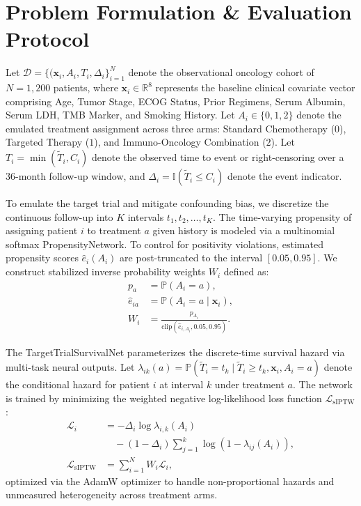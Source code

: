 \documentclass[10pt,twocolumn]{article}
\begin{document}
\section{Problem Formulation \& Evaluation Protocol}
Let $\mathcal{D} = \{(\mathbf{x}_i, A_i, T_i, \Delta_i\}_{i=1}^N$ denote the observational oncology cohort of $N = 1,200$ patients, where $\mathbf{x}_i \in \mathbb{R}^8$ represents the baseline clinical covariate vector comprising Age, Tumor Stage, ECOG Status, Prior Regimens, Serum Albumin, Serum LDH, TMB Marker, and Smoking History. Let $A_i \in \{0, 1, 2\}$ denote the emulated treatment assignment across three arms: Standard Chemotherapy ($0$), Targeted Therapy ($1$), and Immuno-Oncology Combination ($2$). Let $T_i = \min(\tilde{T}_i, C_i)$ denote the observed time to event or right-censoring over a 36-month follow-up window, and $\Delta_i = \mathbb{I}(\tilde{T}_i \le C_i)$ denote the event indicator. 

To emulate the target trial and mitigate confounding bias, we discretize the continuous follow-up into $K$ intervals $t_1, t_2, \dots, t_K$. The time-varying propensity of assigning patient $i$ to treatment $a$ given history is modeled via a multinomial softmax PropensityNetwork. To control for positivity violations, estimated propensity scores $\hat{e}_i(A_i)$ are post-truncated to the interval $[0.05, 0.95]$. We construct stabilized inverse probability weights $W_i$ defined as:
\begin{align}
p_a &= \mathbb{P}(A_i = a), \\
\hat{e}_{ia} &= \mathbb{P}(A_i = a \mid \mathbf{x}_i), \\
W_i &= \frac{p_{A_i}}{\text{clip}(\hat{e}_{i, A_i}, 0.05, 0.95)}.
\end{align}

The TargetTrialSurvivalNet parameterizes the discrete-time survival hazard via multi-task neural outputs. Let $\lambda_{ik}(a) = \mathbb{P}(\tilde{T}_i = t_k \mid \tilde{T}_i \ge t_k, \mathbf{x}_i, A_i = a)$ denote the conditional hazard for patient $i$ at interval $k$ under treatment $a$. The network is trained by minimizing the weighted negative log-likelihood loss function $\mathcal{L}_{\text{sIPTW}}$:
\begin{align}
\mathcal{L}_i &= -\Delta_i \log \lambda_{i,k}(A_i) \\
&\quad - (1-\Delta_i) \sum_{j=1}^k \log(1 - \lambda_{ij}(A_i)), \\
\mathcal{L}_{\text{sIPTW}} &= \sum_{i=1}^N W_i \mathcal{L}_i,
\end{align}
optimized via the AdamW optimizer to handle non-proportional hazards and unmeasured heterogeneity across treatment arms.
\end{document}
